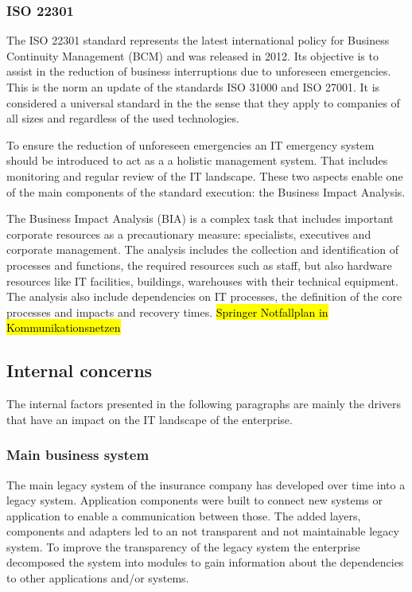 \subsubsection{ISO 22301}

The ISO 22301 standard represents the latest international policy for Business Continuity Management (BCM) and was released in 2012. Its objective is to assist in the reduction of business interruptions due to unforeseen emergencies. This is the norm an update of the standards ISO 31000 and ISO 27001. It is considered a universal standard in the the sense that they apply to companies of all sizes and regardless of the used technologies.

To ensure the reduction of unforeseen emergencies an IT emergency system should be introduced to act as a a holistic management system. That includes monitoring and regular review of the IT landscape. These two aspects enable one of the main components of the standard execution: the Business Impact Analysis. 

The Business Impact Analysis (BIA) is a complex task that includes important corporate resources as a precautionary measure: specialists, executives and corporate management. The analysis includes the collection and identification of processes and functions,
the required resources such as staff, but also hardware resources like IT facilities, buildings, warehouses with their technical equipment. The analysis also include dependencies on IT processes, the definition of the core processes and impacts and recovery times.
\hl{Springer Notfallplan in Kommunikationsnetzen}

\subsection{Internal concerns}\label{subsection:internalinfluencingfactors}

The internal factors presented in the following paragraphs are mainly the drivers that have an impact on the IT landscape of the enterprise.

\subsubsection{Main business system}

The main legacy system of the insurance company has developed over time into a legacy system. Application components were built to connect new systems or application to enable a communication between those. The added layers, components and adapters led to an not transparent and not maintainable legacy system. To improve the transparency of the legacy system the enterprise decomposed the system into modules to gain information about the dependencies to other applications and/or systems.

